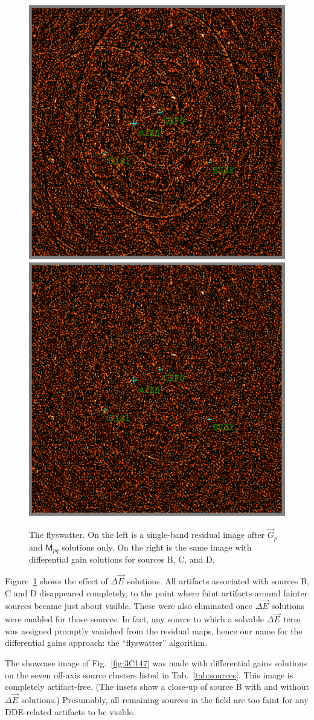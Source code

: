 \documentclass[]{aa}
\newcommand{\jones}[2]{\vec {#1}_{#2}}
\newcommand{\coh}[2]{\mathsf{{#1}}_{{#2}}}
\begin{document}
\begin{figure}
\begin{centering}
\includegraphics[width=.5\columnwidth]{before_dE}%
\includegraphics[width=.5\columnwidth]{after_dE}\par
\end{centering}
\caption{\label{fig:dEsol}The flyswatter. On the left is a single-band residual image after  $\jones{G}{p}$ and $\coh{M}{pq}$ solutions only. On the right is the same image with differential gain solutions for sources B, C, and D.}
\end{figure}

Figure~\ref{fig:dEsol} shows the effect of $\Delta\jones{E}{}$ solutions. All artifacts associated with sources B, C and D disappeared completely, to the point where faint artifacts around fainter sources became just about visible. 
These were also eliminated once $\Delta\jones{E}{}$ solutions were enabled for those sources. In fact, any source to which a solvable $\Delta\jones{E}{}$ term was assigned promptly vanished from the residual maps, hence our name for the differential gains approach: the ``flyswatter'' algorithm. 

The showcase image of Fig.~\ref{fig:3C147} was made with differential gains solutions on the seven off-axis source clusters listed in Tab.~\ref{tab:sources}. This image is completely artifact-free. (The insets show a close-up of source B with and without $\Delta\jones{E}{}$ solutions.) Presumably, all remaining sources in the field are too faint for any DDE-related artifacts to be visible.
\end{document}
